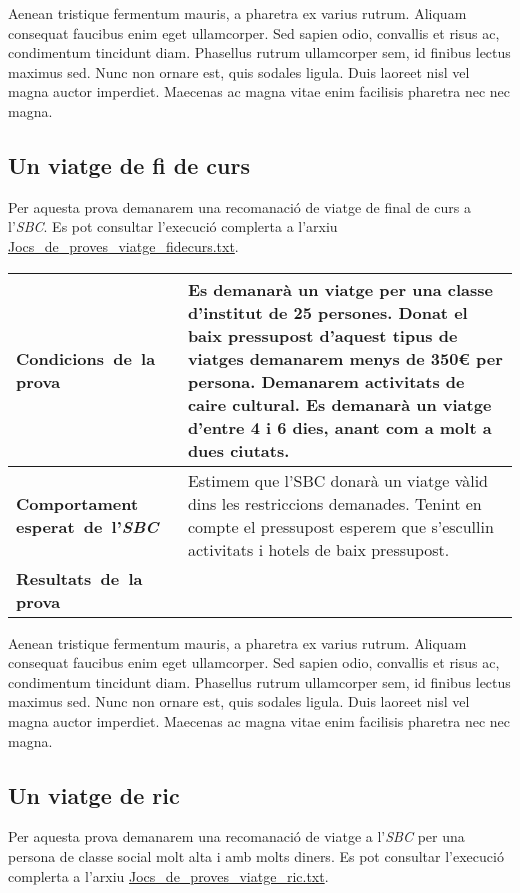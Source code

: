 \documentclass[11pt,a4paper]{article}
\begin{document}
Aenean tristique fermentum mauris, a pharetra ex varius rutrum. Aliquam consequat faucibus enim eget ullamcorper. Sed sapien odio, convallis et risus ac, condimentum tincidunt diam. Phasellus rutrum ullamcorper sem, id finibus lectus maximus sed. Nunc non ornare est, quis sodales ligula. Duis laoreet nisl vel magna auctor imperdiet. Maecenas ac magna vitae enim facilisis pharetra nec nec magna.


\subsection{Un viatge de fi de curs}
Per aquesta prova demanarem una recomanació de viatge de final de curs a l'\emph{SBC}. Es pot consultar l'execució complerta a l'arxiu \url{Jocs_de_proves_viatge_fidecurs.txt}.\\

\noindent
\begin{tabular}{|p{}|p{}|}
\hline
\textbf{\mbox{Condicions de la} \mbox{prova}} & Es demanarà un viatge per una classe d'institut de 25 persones. Donat el baix pressupost d'aquest tipus de viatges demanarem menys de 350\euro{} per persona. Demanarem activitats de caire cultural. Es demanarà un viatge d'entre 4 i 6 dies, anant com a molt a dues ciutats.\\
\hline
\textbf{Comportament \mbox{esperat de l'\emph{SBC}}} & Estimem que l'SBC donarà un viatge vàlid dins les restriccions demanades. Tenint en compte el pressupost esperem que s'escullin activitats i hotels de baix pressupost. \\
\hline
\textbf{\mbox{Resultats de la} \mbox{prova}} & \\
\hline
\end{tabular}
\medskip

Aenean tristique fermentum mauris, a pharetra ex varius rutrum. Aliquam consequat faucibus enim eget ullamcorper. Sed sapien odio, convallis et risus ac, condimentum tincidunt diam. Phasellus rutrum ullamcorper sem, id finibus lectus maximus sed. Nunc non ornare est, quis sodales ligula. Duis laoreet nisl vel magna auctor imperdiet. Maecenas ac magna vitae enim facilisis pharetra nec nec magna.

\subsection{Un viatge de ric}
Per aquesta prova demanarem una recomanació de viatge a l'\emph{SBC} per una persona de classe social molt alta i amb molts diners. Es pot consultar l'execució complerta a l'arxiu \url{Jocs_de_proves_viatge_ric.txt}. \\
\end{document}
